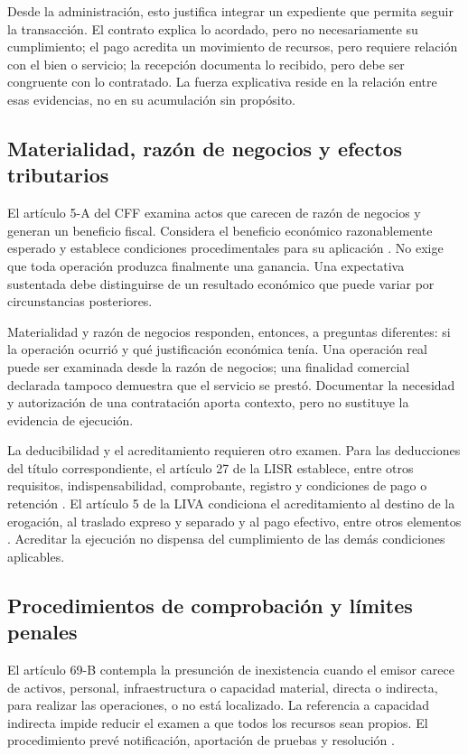 Desde la administración, esto justifica integrar un expediente que permita
seguir la transacción. El contrato explica lo acordado, pero no necesariamente
su cumplimiento; el pago acredita un movimiento de recursos, pero requiere
relación con el bien o servicio; la recepción documenta lo recibido, pero debe
ser congruente con lo contratado. La fuerza explicativa reside en la relación
entre esas evidencias, no en su acumulación sin propósito.

\subsection{Materialidad, razón de negocios y efectos tributarios}

El artículo 5-A del CFF examina actos que carecen de razón de negocios y
generan un beneficio fiscal. Considera el beneficio económico razonablemente
esperado y establece condiciones procedimentales para su aplicación
\parencite[art. 5-A]{cff2026}. No exige que toda operación produzca finalmente
una ganancia. Una expectativa sustentada debe distinguirse de un resultado
económico que puede variar por circunstancias posteriores.

Materialidad y razón de negocios responden, entonces, a preguntas diferentes:
si la operación ocurrió y qué justificación económica tenía. Una operación
real puede ser examinada desde la razón de negocios; una finalidad comercial
declarada tampoco demuestra que el servicio se prestó. Documentar la
necesidad y autorización de una contratación aporta contexto, pero no
sustituye la evidencia de ejecución.

La deducibilidad y el acreditamiento requieren otro examen. Para las
deducciones del título correspondiente, el artículo 27 de la LISR establece,
entre otros requisitos, indispensabilidad, comprobante, registro y condiciones
de pago o retención \parencite[art. 27]{lisr2024}. El artículo 5 de la LIVA
condiciona el acreditamiento al destino de la erogación, al traslado expreso
y separado y al pago efectivo, entre otros elementos
\parencite[art. 5]{liva2021}. Acreditar la ejecución no dispensa del
cumplimiento de las demás condiciones aplicables.

\subsection{Procedimientos de comprobación y límites penales}

El artículo 69-B contempla la presunción de inexistencia cuando el emisor
carece de activos, personal, infraestructura o capacidad material, directa o
indirecta, para realizar las operaciones, o no está localizado. La referencia
a capacidad indirecta impide reducir el examen a que todos los recursos sean
propios. El procedimiento prevé notificación, aportación de pruebas y
resolución \parencite[art. 69-B]{cff2026}.


